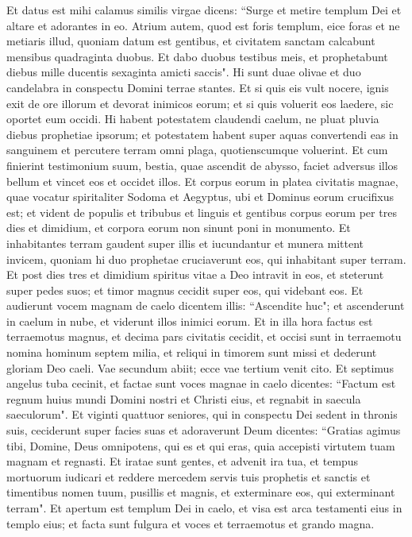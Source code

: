 \begin{biblechapter}  
\verse Et datus est mihi calamus similis virgae dicens: “Surge et metire templum Dei et altare et adorantes in eo. 
\verse Atrium autem, quod est foris templum, eice foras et ne metiaris illud, quoniam datum est gentibus, et civitatem sanctam calcabunt mensibus quadraginta duobus. 
\verse Et dabo duobus testibus meis, et prophetabunt diebus mille ducentis sexaginta amicti saccis". 
\verse Hi sunt duae olivae et duo candelabra in conspectu Domini terrae stantes.  
\verse Et si quis eis vult nocere, ignis exit de ore illorum et devorat inimicos eorum; et si quis voluerit eos laedere, sic oportet eum occidi. 
\verse Hi habent potestatem claudendi caelum, ne pluat pluvia diebus prophetiae ipsorum; et potestatem habent super aquas convertendi eas in sanguinem et percutere terram omni plaga, quotienscumque voluerint. 
\verse Et cum finierint testimonium suum, bestia, quae ascendit de abysso, faciet adversus illos bellum et vincet eos et occidet illos. 
\verse Et corpus eorum in platea civitatis magnae, quae vocatur spiritaliter Sodoma et Aegyptus, ubi et Dominus eorum crucifixus est; 
\verse et vident de populis et tribubus et linguis et gentibus corpus eorum per tres dies et dimidium, et corpora eorum non sinunt poni in monumento. 
\verse Et inhabitantes terram gaudent super illis et iucundantur et munera mittent invicem, quoniam hi duo prophetae cruciaverunt eos, qui inhabitant super terram. 
\verse Et post dies tres et dimidium spiritus vitae a Deo intravit in eos, et steterunt super pedes suos; et timor magnus cecidit super eos, qui videbant eos. 
\verse Et audierunt vocem magnam de caelo dicentem illis: “Ascendite huc"; et ascenderunt in caelum in nube, et viderunt illos inimici eorum. 
\verse Et in illa hora factus est terraemotus magnus, et decima pars civitatis cecidit, et occisi sunt in terraemotu nomina hominum septem milia, et reliqui in timorem sunt missi et dederunt gloriam Deo caeli. 
\verse Vae secundum abiit; ecce vae tertium venit cito. 
\verse Et septimus angelus tuba cecinit, et factae sunt voces magnae in caelo dicentes: “Factum est regnum huius mundi Domini nostri et Christi eius, et regnabit in saecula saeculorum". 
\verse Et viginti quattuor seniores, qui in conspectu Dei sedent in thronis suis, ceciderunt super facies suas et adoraverunt Deum 
\verse dicentes: “Gratias agimus tibi, Domine, Deus omnipotens, qui es et qui eras, quia accepisti virtutem tuam magnam et regnasti. 
\verse Et iratae sunt gentes, et advenit ira tua, et tempus mortuorum iudicari et reddere mercedem servis tuis prophetis et sanctis et timentibus nomen tuum, pusillis et magnis, et exterminare eos, qui exterminant terram". 
\verse Et apertum est templum Dei in caelo, et visa est arca testamenti eius in templo eius; et facta sunt fulgura et voces et terraemotus et grando magna. 
\end{biblechapter}

